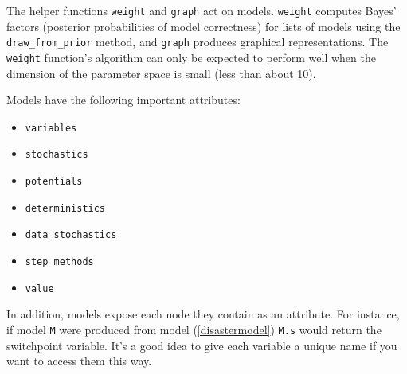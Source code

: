 The helper functions \texttt{weight} and \texttt{graph} act on models. \texttt{weight} computes Bayes' factors (posterior probabilities of model correctness) for lists of models using the \texttt{draw_from_prior} method, and \texttt{graph} produces graphical representations. The \texttt{weight} function's algorithm can only be expected to perform well when the dimension of the parameter space is small (less than about 10).

Models have the following important attributes:
\begin{itemize}
    \item \texttt{variables}
    \item \texttt{stochastics}
    \item \texttt{potentials}
    \item \texttt{deterministics}
    \item \texttt{data_stochastics}
    \item \texttt{step_methods}
    \item \texttt{value}
\end{itemize}

In addition, models expose each node they contain as an attribute. For instance, if model \texttt{M} were produced from model (\ref{disastermodel}) \texttt{M.s} would return the switchpoint variable. It's a good idea to give each variable a unique name if you want to access them this way.


